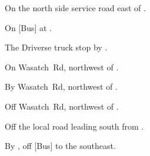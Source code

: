 
\begin{LocationList}

On the north side  service road east of .

On [Bus] at .

The Driverse truck stop by  .

\Location{\GarageHQ \Garage}
On Wasatch~Rd, northwest of  .

By Wasatch~Rd, northwest of  .

Off Wasatch~Rd, northwest of  .

Off the local road leading south from  .

By  , off [Bus] to the southeast.

\end{LocationList}

